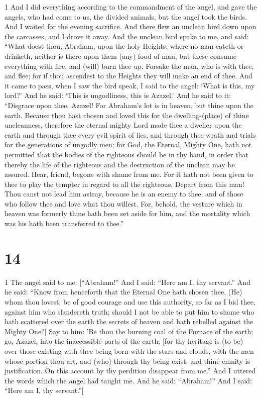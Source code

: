 \par 1 And I did everything according to the commandment of the angel, and gave the angels, who had come to us, the divided animals, but the angel took the birds. And I waited for the evening sacrifice. And there flew an unclean bird down upon the carcasses, and I drove it away. And the unclean bird spake to me, and said: “What doest thou, Abraham, upon the holy Heights, where no man eateth or drinketh, neither is there upon them (any) food of man, but these consume everything with fire, and (will) burn thee up. Forsake the man, who is with thee, and flee; for if thou ascendest to the Heights they will make an end of thee. And it came to pass, when I saw the bird speak, I said to the angel: ‘What is this, my lord?’ And he said: ‘This is ungodliness, this is Azazel.’ And he said to it: “Disgrace upon thee, Azazel! For Abraham's lot is in heaven, but thine upon the earth. Because thou hast chosen and loved this for the dwelling-(place) of thine uncleanness, therefore the eternal mighty Lord made thee a dweller upon the earth and through thee every evil spirit of lies, and through thee wrath and trials for the generations of ungodly men; for God, the Eternal, Mighty One, hath not permitted that the bodies of the righteous should be in thy hand, in order that thereby the life of the righteous and the destruction of the unclean may be assured. Hear, friend, begone with shame from me. For it hath not been given to thee to play the tempter in regard to all the righteous. Depart from this man! Thou canst not lead him astray, because he is an enemy to thee, and of those who follow thee and love what thou willest. For, behold, the vesture which in heaven was formerly thine hath been set aside for him, and the mortality which was his hath been transferred to thee.”

\chapter{14}

\par 1 The angel said to me: [“Abraham!” And I said: “Here am I, thy servant.” And he said: “Know from henceforth that the Eternal One hath chosen thee, (He) whom thou lovest; be of good courage and use this authority, so far as I bid thee, against him who slandereth truth; should I not be able to put him to shame who hath scattered over the earth the secrets of heaven and hath rebelled against the Mighty One?] Say to him: 'Be thou the burning coal of the Furnace of the earth; go, Azazel, into the inaccessible parts of the earth; [for thy heritage is (to be) over those existing with thee being born with the stars and clouds, with the men whose portion thou art, and (who) through thy being exist; and thine enmity is justification. On this account by thy perdition disappear from me.” And I uttered the words which the angel had taught me. And he said: “Abraham!” And I said: “Here am I, thy servant.”]

